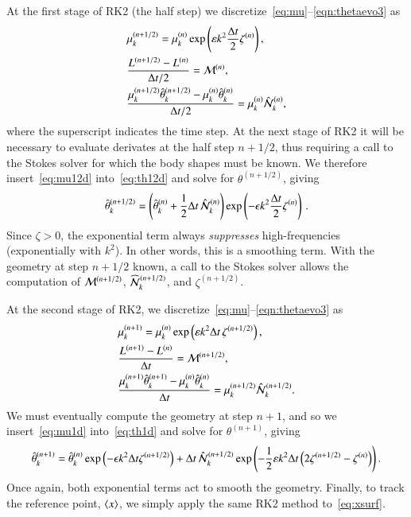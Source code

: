 \documentclass[preprint, 10pt]{elsarticle}
\begin{document}
At the first stage of RK2 (the half step) we discretize~\eqref{eq:mu}--\eqref{eqn:thetaevo3} as
\begin{align}
\label{eq:mu12d}
& \mu_k^{(n+1/2)} = \mu_k^{(n)} \exp \left( \varepsilon k^2 \frac{\Delta t}{2}
\zeta^{(n)} \right), \\
\label{eq:L12d}
& \frac{L^{(n+1/2)} - L^{(n)}}{\Delta t/2} = \mathcal{M}^{(n)}, \\
\label{eq:th12d}
& \frac{ \mu_k^{(n+1/2)} \hat{\theta}_k^{(n+1/2)} - \mu_k^{(n)} \hat{\theta}_k^{(n)}}{\Delta t/2} 
= \mu_k^{(n)} \hat{\mathcal{N}}_k^{(n)},
\end{align}
where the superscript indicates the time step. At the next stage of RK2 it will be necessary to evaluate derivates at the half step $n+1/2$, thus requiring a call to the Stokes solver for which the body shapes must be known. We therefore insert~\eqref{eq:mu12d} into~\eqref{eq:th12d} and solve for $\theta^{(n+1/2)}$, giving
\begin{align}
\label{eq:th12}
\hat{\theta}_k^{(n+1/2)} = \left( \hat{\theta}_k^{(n)} + \frac{1}{2} \Delta t \, \hat{\mathcal{N}}_k^{(n)} \right)
\exp \left( -\epsilon k^2 \frac{\Delta t}{2} \zeta^{(n)}\right) \, .
\end{align}
Since $\zeta >0$, the exponential term always {\em suppresses} high-frequencies (exponentially with $k^2$). In other words, this is a smoothing term. With the geometry at step $n+1/2$ known, a call to the Stokes solver allows the computation of $\mathcal{M}^{(n+1/2)}$, $\widehat{\NLterm}_k^{(n+1/2)}$, and $\zeta^{(n+1/2)}$.

At the second stage of RK2, we discretize~\eqref{eq:mu}--\eqref{eqn:thetaevo3} as 
\begin{align}
\label{eq:mu1d}
& \mu_k^{(n+1)} = \mu_k^{(n)} \exp \left( \varepsilon k^2 {\Delta t} \,
\zeta^{(n+1/2)} \right), \\
\label{eq:L1d}
& \frac{L^{(n+1)} - L^{(n)}}{\Delta t} = \mathcal{M}^{(n+1/2)}, \\
\label{eq:th1d}
& \frac{ \mu_k^{(n+1)} \hat{\theta}_k^{(n+1)} - \mu_k^{(n)} \hat{\theta}_k^{(n)}}{\Delta t} =
\mu_k^{(n+1/2)} \hat{\mathcal{N}}_k^{(n+1/2)}.
\end{align}
We must eventually compute the geometry at step $n+1$, and so we insert~\eqref{eq:mu1d} into~\eqref{eq:th1d} and solve for $\theta^{(n+1)}$, giving
\begin{align}
\hat{\theta}_k^{(n+1)} =  \hat{\theta}_k^{(n)} \exp \left( - \epsilon k^2 \Delta t \zeta^{(n+1/2)} \right) + \Delta t \, \hat{\mathcal{N}}_k^{(n+1/2)} \exp \left( - \frac{1}{2} \varepsilon k^2 \Delta t \left( 2 \zeta^{(n+1/2)} - \zeta^{(n)} \right) \right).
\end{align}
Once again, both exponential terms act to smooth the geometry. Finally, to track the reference point, $\left< x \right>$, we simply apply the same RK2 method to~\eqref{eq:xsurf}.
\end{document}
